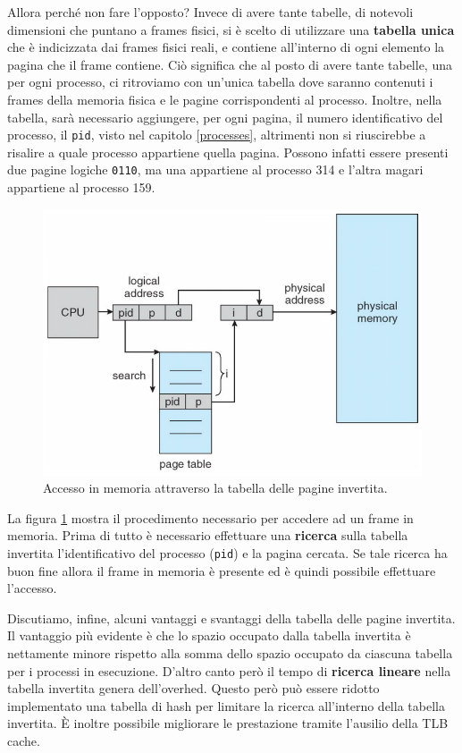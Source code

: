 Allora perché non fare l'opposto? Invece di avere tante tabelle, di notevoli dimensioni che puntano a frames fisici, si è scelto di utilizzare una \textbf{tabella unica} che è indicizzata dai frames fisici reali, e contiene all'interno di ogni elemento la pagina che il frame contiene. Ciò significa che al posto di avere tante tabelle, una per ogni processo, ci ritroviamo con un'unica tabella dove saranno contenuti i frames della memoria fisica e le pagine corrispondenti al processo. Inoltre, nella tabella, sarà necessario aggiungere, per ogni pagina, il numero identificativo del processo, il \texttt{pid}, visto nel capitolo \ref{processes}, altrimenti non si riuscirebbe a risalire a quale processo appartiene quella pagina. Possono infatti essere presenti due pagine logiche \texttt{0110}, ma una appartiene al processo 314 e l'altra magari appartiene al processo 159.
\begin{figure}[h]
    \centering
    \includegraphics[width = .6\textwidth]{../res/imgs/main memory/inverted_page_table.png}
    \caption{Accesso in memoria attraverso la tabella delle pagine invertita.}
    \label{fig:inverted_page_table}
\end{figure}

\noindent La figura \ref{fig:inverted_page_table} mostra il procedimento necessario per accedere ad un frame in memoria. Prima di tutto è necessario effettuare una \textbf{ricerca} sulla tabella invertita l'identificativo del processo (\texttt{pid}) e la pagina cercata. Se tale ricerca ha buon fine allora il frame in memoria è presente ed è quindi possibile effettuare l'accesso.

Discutiamo, infine, alcuni vantaggi e svantaggi della tabella delle pagine invertita. Il vantaggio più evidente è che lo spazio occupato dalla tabella invertita è nettamente minore rispetto alla somma dello spazio occupato da ciascuna tabella per i processi in esecuzione. D'altro canto però il tempo di \textbf{ricerca lineare} nella tabella invertita genera dell'overhed. Questo però può essere ridotto implementato una tabella di hash per limitare la ricerca all'interno della tabella invertita. È inoltre possibile migliorare le prestazione tramite l'ausilio della TLB cache.

